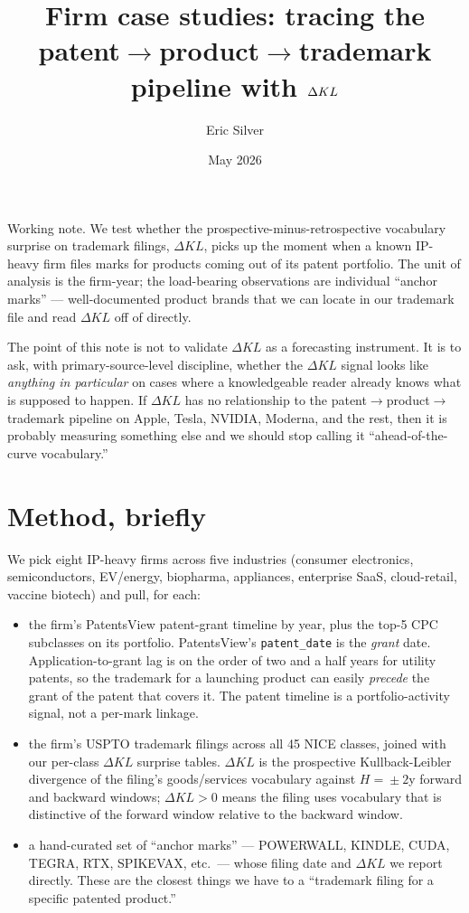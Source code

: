\documentclass[11pt]{article}
\title{Firm case studies: tracing the patent$\to$product$\to$trademark
pipeline with $\dKL$}
\author{Eric Silver}
\affil{}
\date{May 2026}
\newcommand{\dKL}{\Delta KL}
\begin{document}
\maketitle

\noindent
Working note. We test whether the prospective-minus-retrospective vocabulary
surprise on trademark filings, $\dKL$, picks up the moment when a known
IP-heavy firm files marks for products coming out of its patent
portfolio. The unit of analysis is the firm-year; the load-bearing
observations are individual ``anchor marks'' --- well-documented product
brands that we can locate in our trademark file and read $\dKL$ off of
directly.

The point of this note is not to validate $\dKL$ as a forecasting
instrument. It is to ask, with primary-source-level discipline, whether
the $\dKL$ signal looks like \emph{anything in particular} on cases
where a knowledgeable reader already knows what is supposed to happen.
If $\dKL$ has no relationship to the patent$\to$product$\to$trademark
pipeline on Apple, Tesla, NVIDIA, Moderna, and the rest, then it is
probably measuring something else and we should stop calling it
``ahead-of-the-curve vocabulary.''

\section*{Method, briefly}

We pick eight IP-heavy firms across five industries (consumer
electronics, semiconductors, EV/energy, biopharma, appliances,
enterprise SaaS, cloud-retail, vaccine biotech) and pull, for each:
\begin{itemize}
\item the firm's PatentsView patent-grant timeline by year, plus
the top-5 CPC subclasses on its portfolio. PatentsView's
\texttt{patent\_date} is the \emph{grant} date. Application-to-grant
lag is on the order of two and a half years for utility patents,
so the trademark for a launching product can easily \emph{precede}
the grant of the patent that covers it. The patent timeline is a
portfolio-activity signal, not a per-mark linkage.
\item the firm's USPTO trademark filings across all 45 NICE classes,
joined with our per-class $\dKL$ surprise tables. $\dKL$ is the
prospective Kullback-Leibler divergence of the filing's
goods/services vocabulary against $H=\!\pm 2$y forward and backward
windows; $\dKL > 0$ means the filing uses vocabulary that is
distinctive of the forward window relative to the backward window.
\item a hand-curated set of ``anchor marks'' --- POWERWALL, KINDLE,
CUDA, TEGRA, RTX, SPIKEVAX, etc.\ --- whose filing date and $\dKL$
we report directly. These are the closest things we have to a
``trademark filing for a specific patented product.''
\end{itemize}
\end{document}

